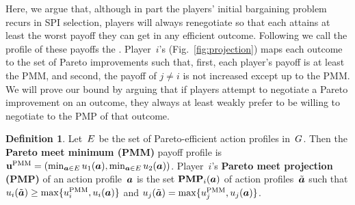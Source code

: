 \documentclass[sigconf]{aamas}
\theoremstyle{definition}
\newtheorem{definition}{Definition} %
\begin{document}
Here, we argue
that, although in part the players' initial bargaining
problem recurs in SPI selection,
players will always renegotiate
so that each attains at least
the worst payoff they can get in any
efficient outcome. Following
\citet{Rabin1991AMO} we call the profile of
these payoffs the
.
Player~$i$'s 
(Fig.~\ref{fig:projection})
maps each outcome
to the
set of
Pareto improvements
such that, first,
each player's payoff
is at least the PMM,
and second, the payoff
of $j \neq i$
is not increased
except up to the PMM.
We will prove our bound by 
arguing that if 
players attempt to negotiate 
a Pareto improvement on an outcome,
they always at least weakly 
prefer to be willing to 
negotiate to the PMP of that outcome.

\begin{definition}
Let~${E}$ be the set of Pareto-efficient
action profiles in~$G$.
Then the
\textbf{Pareto meet minimum (PMM)}
payoff profile
is $\textbf{u}^{\textnormal{PMM}} = (\min_{\boldsymbol{a} \in {E}} u_1(\boldsymbol{a}), \min_{\boldsymbol{a} \in {E}} u_2(\boldsymbol{a}))$.
Player~$i$'s \textbf{Pareto meet projection (PMP)}
of an action profile~$\boldsymbol{a}$
is the set
$\mathbf{PMP}_i(\boldsymbol{a})$
of action profiles~$\tilde{\boldsymbol{a}}$
such that
$u_i(\tilde{\boldsymbol{a}}) \geq \max\{u_i^{\textnormal{PMM}}, u_i(\boldsymbol{a})\}$
and
$u_j(\tilde{\boldsymbol{a}}) = \max\{u_j^{\textnormal{PMM}}, u_j(\boldsymbol{a})\}$.
\end{definition}
\end{document}
